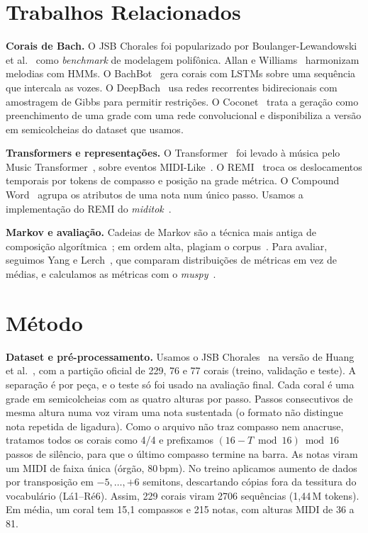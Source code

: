 \documentclass{article}
\begin{document}
\section{Trabalhos Relacionados}\label{sec:related}
\textbf{Corais de Bach.} O JSB Chorales foi popularizado por Boulanger-Lewandowski et al.~\cite{boulanger2012} como \textit{benchmark} de modelagem polifônica. Allan e Williams~\cite{allan2005} harmonizam melodias com HMMs. O BachBot~\cite{liang2017bachbot} gera corais com LSTMs sobre uma sequência que intercala as vozes. O DeepBach~\cite{hadjeres2017} usa redes recorrentes bidirecionais com amostragem de Gibbs para permitir restrições. O Coconet~\cite{huang2017coconet} trata a geração como preenchimento de uma grade com uma rede convolucional e disponibiliza a versão em semicolcheias do dataset que usamos.

\textbf{Transformers e representações.} O Transformer~\cite{vaswani2017} foi levado à música pelo Music Transformer~\cite{huang2019musictransformer}, sobre eventos MIDI-Like~\cite{oore2020}. O REMI~\cite{huang2020remi} troca os deslocamentos temporais por tokens de compasso e posição na grade métrica. O Compound Word~\cite{hsiao2021cp} agrupa os atributos de uma nota num único passo. Usamos a implementação do REMI do \textit{miditok}~\cite{fradet2021miditok}.

\textbf{Markov e avaliação.} Cadeias de Markov são a técnica mais antiga de composição algorítmica~\cite{hiller1959,ames1989,conklin2003}; em ordem alta, plagiam o corpus~\cite{papadopoulos2014}. Para avaliar, seguimos Yang e Lerch~\cite{yang2020evaluation}, que comparam distribuições de métricas em vez de médias, e calculamos as métricas com o \textit{muspy}~\cite{dong2020muspy}.

\section{Método}\label{sec:method}
\textbf{Dataset e pré-processamento.} Usamos o JSB Chorales~\cite{boulanger2012} na versão de Huang et al.~\cite{huang2017coconet}, com a partição oficial de 229, 76 e 77 corais (treino, validação e teste). A separação é por peça, e o teste só foi usado na avaliação final. Cada coral é uma grade em semicolcheias com as quatro alturas por passo. Passos consecutivos de mesma altura numa voz viram uma nota sustentada (o formato não distingue nota repetida de ligadura). Como o arquivo não traz compasso nem anacruse, tratamos todos os corais como 4/4 e prefixamos $(16 - T \bmod 16) \bmod 16$ passos de silêncio, para que o último compasso termine na barra. As notas viram um MIDI de faixa única (órgão, 80\,bpm). No treino aplicamos aumento de dados por transposição em $-5,\dots,+6$ semitons, descartando cópias fora da tessitura do vocabulário (Lá1--Ré6). Assim, 229 corais viram 2706 sequências (1{,}44\,M tokens). Em média, um coral tem 15{,}1 compassos e 215 notas, com alturas MIDI de 36 a 81.
\end{document}
